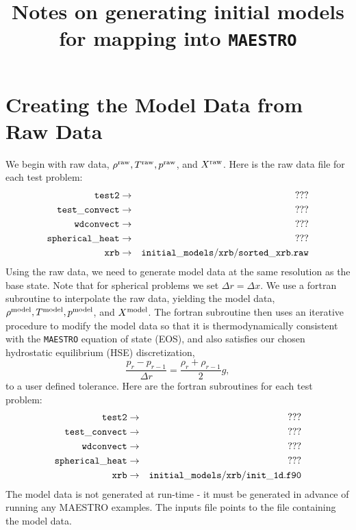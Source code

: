 \documentclass[11pt]{article}
\title{Notes on generating initial models for mapping into {\tt MAESTRO}}
\def\model {\rm model}
\def\raw   {\rm raw}
\begin{document}
\maketitle
\tableofcontents

\clearpage

\section{Creating the Model Data from Raw Data}
We begin with raw data, $\rho^{\raw}, T^{\raw}, p^{\raw}$, and $X^{\raw}$.  Here is the raw data file for each test problem:
\begin{eqnarray}
{\tt test2} & \rightarrow & {\tt ???} \nonumber \\
{\tt test\_convect} & \rightarrow & {\tt ???} \nonumber \\
{\tt wdconvect} & \rightarrow & {\tt ???} \nonumber \\
{\tt spherical\_heat} & \rightarrow & {\tt ???} \nonumber \\
{\tt xrb} & \rightarrow & {\tt initial\_models/xrb/sorted\_xrb.raw} \nonumber
\end{eqnarray}
Using the raw data, we need to generate model data at the same resolution as the base state.  Note that for spherical problems we set $\Delta r = \Delta x$.  We use a fortran subroutine to interpolate the raw data, yielding the model data, $\rho^{\model}, T^{\model}, p^{\model}$, and $X^{\model}$.  The fortran subroutine then uses an iterative procedure to modify the model data so that it is thermodynamically consistent with the {\tt MAESTRO} equation of state (EOS), and also satisfies our chosen hydrostatic equilibrium (HSE) discretization,
\begin{equation}
\frac{p_r - p_{r-1}}{\Delta r} = \frac{\rho_r + \rho_{r-1}}{2}g,\label{HSE Discretization}
\end{equation}
to a user defined tolerance.  Here are the fortran subroutines for each test problem:
\begin{eqnarray}
{\tt test2} & \rightarrow & {\tt ???} \nonumber \\
{\tt test\_convect} & \rightarrow & {\tt ???} \nonumber \\
{\tt wdconvect} & \rightarrow & {\tt ???} \nonumber \\
{\tt spherical\_heat} & \rightarrow & {\tt ???} \nonumber \\
{\tt xrb} & \rightarrow & {\tt initial\_models/xrb/init\_1d.f90} \nonumber
\end{eqnarray}
The model data is not generated at run-time - it must be generated in advance of running any MAESTRO examples.  The inputs file points to the file containing the model data.
\end{document}
